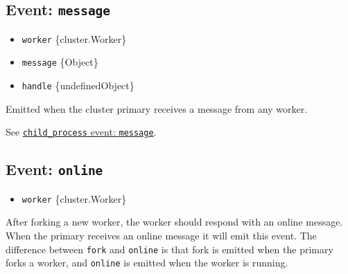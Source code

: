 \subsection{\texorpdfstring{Event:
\texttt{\textquotesingle{}message\textquotesingle{}}}{Event: \textquotesingle message\textquotesingle{}}}\label{event-message-1}

\begin{itemize}
\tightlist
\item
  \texttt{worker} \{cluster.Worker\}
\item
  \texttt{message} \{Object\}
\item
  \texttt{handle} \{undefined\textbar Object\}
\end{itemize}

Emitted when the cluster primary receives a message from any worker.

See \href{child_process.md\#event-message}{\texttt{child\_process}
event: \texttt{\textquotesingle{}message\textquotesingle{}}}.

\subsection{\texorpdfstring{Event:
\texttt{\textquotesingle{}online\textquotesingle{}}}{Event: \textquotesingle online\textquotesingle{}}}\label{event-online-1}

\begin{itemize}
\tightlist
\item
  \texttt{worker} \{cluster.Worker\}
\end{itemize}

After forking a new worker, the worker should respond with an online
message. When the primary receives an online message it will emit this
event. The difference between
\texttt{\textquotesingle{}fork\textquotesingle{}} and
\texttt{\textquotesingle{}online\textquotesingle{}} is that fork is
emitted when the primary forks a worker, and
\texttt{\textquotesingle{}online\textquotesingle{}} is emitted when the
worker is running.

\begin{Shaded}
\begin{Highlighting}[]
\NormalTok{(}\OperatorTok{,}\KeywordTok{=\textgreater{}}\NormalTok{ \{}
  \NormalTok{(}\NormalTok{)}\OperatorTok{;}
\NormalTok{\})}\OperatorTok{;}
\end{Highlighting}
\end{Shaded}

